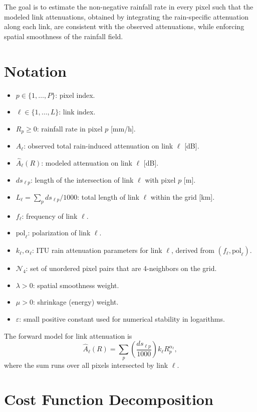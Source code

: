 \documentclass[12pt]{article}
\begin{document}
The goal is to estimate the non-negative rainfall rate in every pixel such that the modeled link attenuations, obtained by integrating the rain-specific attenuation along each link, are consistent with the observed attenuations, while enforcing spatial smoothness of the rainfall field.

\section{Notation}

\begin{itemize}
  \item $p \in \{1,\dots,P\}$: pixel index.
  \item $\ell \in \{1,\dots,L\}$: link index.
  \item $R_p \ge 0$: rainfall rate in pixel $p$ [mm/h].
  \item $A_\ell$: observed total rain-induced attenuation on link $\ell$ [dB].
  \item $\hat A_\ell(R)$: modeled attenuation on link $\ell$ [dB].
  \item $ds_{\ell p}$: length of the intersection of link $\ell$ with pixel $p$ [m].
  \item $L_\ell = \sum_p ds_{\ell p} / 1000$: total length of link $\ell$ within the grid [km].
  \item $f_\ell$: frequency of link $\ell$.
  \item $\mathrm{pol}_\ell$: polarization of link $\ell$.
  \item $k_\ell, \alpha_\ell$: ITU rain attenuation parameters for link $\ell$, derived from $(f_\ell,\mathrm{pol}_\ell)$.
  \item $\mathcal N_4$: set of unordered pixel pairs that are 4-neighbors on the grid.
  \item $\lambda > 0$: spatial smoothness weight.
  \item $\mu > 0$: shrinkage (energy) weight.
  \item $\varepsilon$: small positive constant used for numerical stability in logarithms.
\end{itemize}

The forward model for link attenuation is
\[
\hat A_\ell(R)
=
\sum_{p}
\left(\frac{ds_{\ell p}}{1000}\right)
k_\ell R_p^{\alpha_\ell},
\]
where the sum runs over all pixels intersected by link $\ell$.

\section{Cost Function Decomposition}
\end{document}
